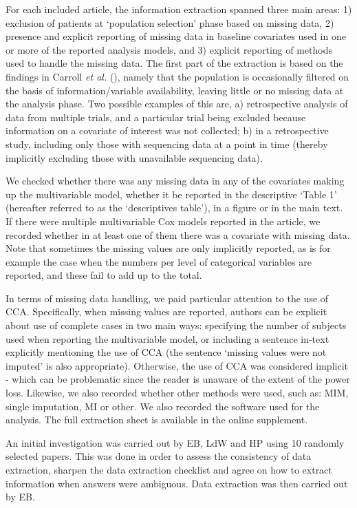 \documentclass[
  letterpaper,
  paper=240mm:170mm,
  twoside=true,
  open=right,
  fontsize=10pt,
  pagesize=false,
  BCOR=15mm,
  DIV=14,
  headinclude=true,
  footinclude=false,
  headsepline=on]{scrbook}
\begin{document}
For each included article, the information extraction spanned three main
areas: 1) exclusion of patients at `population selection' phase based on
missing data, 2) presence and explicit reporting of missing data in
baseline covariates used in one or more of the reported analysis models,
and 3) explicit reporting of methods used to handle the missing data.
The first part of the extraction is based on the findings in Carroll
\emph{et al.} (), namely
that the population is occasionally filtered on the basis of
information/variable availability, leaving little or no missing data at
the analysis phase. Two possible examples of this are, a) retrospective
analysis of data from multiple trials, and a particular trial being
excluded because information on a covariate of interest was not
collected; b) in a retrospective study, including only those with
sequencing data at a point in time (thereby implicitly excluding those
with unavailable sequencing data).

We checked whether there was any missing data in any of the covariates
making up the multivariable model, whether it be reported in the
descriptive `Table 1' (hereafter referred to as the `descriptives
table'), in a figure or in the main text. If there were multiple
multivariable Cox models reported in the article, we recorded whether in
at least one of them there was a covariate with missing data. Note that
sometimes the missing values are only implicitly reported, as is for
example the case when the numbers per level of categorical variables are
reported, and these fail to add up to the total.

In terms of missing data handling, we paid particular attention to the
use of CCA. Specifically, when missing values are reported, authors can
be explicit about use of complete cases in two main ways: specifying the
number of subjects used when reporting the multivariable model, or
including a sentence in-text explicitly mentioning the use of CCA (the
sentence `missing values were not imputed' is also appropriate).
Otherwise, the use of CCA was considered implicit - which can be
problematic since the reader is unaware of the extent of the power loss.
Likewise, we also recorded whether other methods were used, such as:
MIM, single imputation, MI or other. We also recorded the software used
for the analysis. The full extraction sheet is available in the online
supplement.

An initial investigation was carried out by EB, LdW and HP using 10
randomly selected papers. This was done in order to assess the
consistency of data extraction, sharpen the data extraction checklist
and agree on how to extract information when answers were ambiguous.
Data extraction was then carried out by EB.
\end{document}
